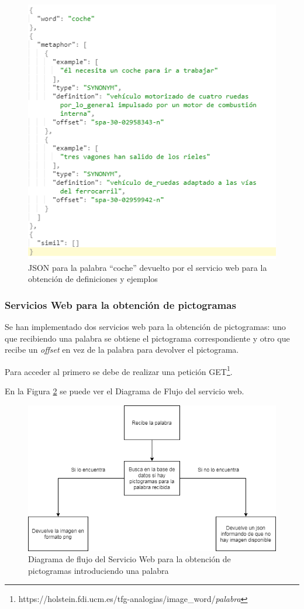 \begin{figure}[!h]
	\includegraphics[width=.6\textwidth]{Imagenes/Bitmap/Capitulo4/JSON-SW/def_example.png}
	\centering
	\caption{JSON para la palabra ``coche'' devuelto por el servicio web para la obtención de definiciones y ejemplos}
	\label{fig:peticionDefYEjemplos}
\end{figure}






\subsubsection{Servicios Web para la obtención de pictogramas}
\label{cap:subsec:sw_pictos}

Se han implementado dos servicios web para la obtención de pictogramas: uno que recibiendo una palabra se obtiene el pictograma correspondiente y otro que recibe un \textit{offset} en vez de la palabra para devolver el pictograma. 

Para acceder al primero se debe de realizar una petición GET\footnote{https://holstein.fdi.ucm.es/tfg-analogias/image\_word/\textit{palabra}}.


En la Figura \ref{fig:swpictos_palabra} se puede ver el Diagrama de Flujo del servicio web.
\begin{figure}[!h]
	\includegraphics[width=.9\textwidth]{Imagenes/Bitmap/Capitulo4/ServiciosWeb/pictoPalabra.png}
	\centering
	\caption{Diagrama de flujo del Servicio Web para la obtención de pictogramas introduciendo una palabra}
	\label{fig:swpictos_palabra}
\end{figure}

